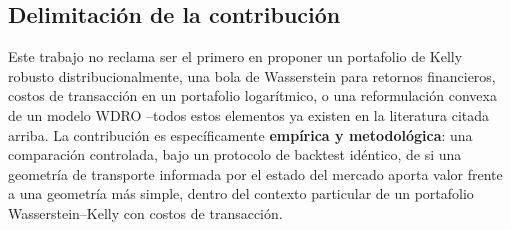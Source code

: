 \documentclass[11pt]{article}
\begin{document}
\subsection{Delimitación de la contribución}

Este trabajo no reclama ser el primero en proponer un portafolio de Kelly robusto
distribucionalmente, una bola de Wasserstein para retornos financieros, costos de
transacción en un portafolio logarítmico, o una reformulación convexa de un modelo WDRO
--todos estos elementos ya existen en la literatura citada arriba. La contribución es
específicamente \textbf{empírica y metodológica}: una comparación controlada, bajo un
protocolo de backtest idéntico, de si una geometría de transporte informada por el estado
del mercado aporta valor frente a una geometría más simple, dentro del contexto particular
de un portafolio Wasserstein--Kelly con costos de transacción.



\end{document}
